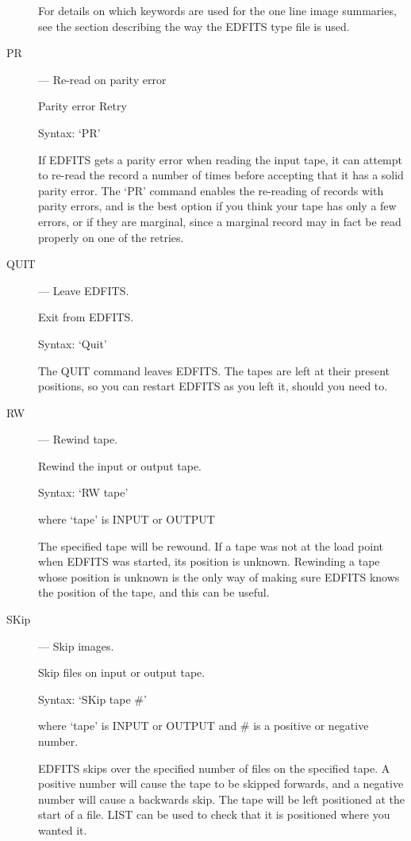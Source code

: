 \begin{description}
For details on which keywords are used for the one line image summaries,
see the section describing the way the EDFITS type file is used.

\item [PR] --- Re-read on parity error

Parity error Retry

Syntax:  `PR'

If EDFITS gets a parity error when reading the input tape, it can
attempt to re-read the record a number of times before accepting
that it has a solid parity error.  The `PR' command enables the
re-reading of records with parity errors, and is the best option if
you think your tape has only a few errors, or if they are marginal,
since a marginal record may in fact be read properly on one of the
retries.

\item [QUIT] --- Leave EDFITS.

Exit from EDFITS.

Syntax:  `Quit'

The QUIT command leaves EDFITS.  The tapes are left at their present
positions, so you can restart EDFITS as you left it, should you need to.

\item [RW] --- Rewind tape.

Rewind the input or output tape.

Syntax:  `RW  tape'

where `tape' is INPUT or OUTPUT

The specified tape will be rewound.  If a tape was not at the load
point when EDFITS was started, its position is unknown.  Rewinding
a tape whose position is unknown is the only way of making sure
EDFITS knows the position of the tape, and this can be useful.

\item [SKip] --- Skip images.

Skip files on input or output tape.

Syntax:   `SKip  tape  \#'

where `tape' is INPUT or OUTPUT and \# is a positive or negative number.

EDFITS skips over the specified number of files on the specified tape.
A positive number will cause the tape to be skipped forwards, and a
negative number will cause a backwards skip.  The tape will be left
positioned at the start of a file.  LIST can be used to check that
it is positioned where you wanted it.


\end{description}
